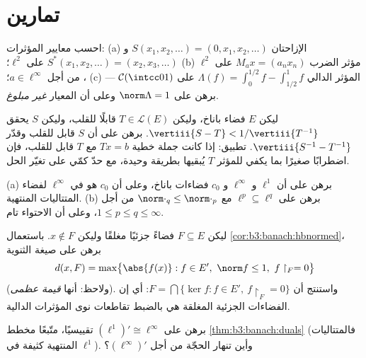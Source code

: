 \section{تمارين}

\begin{exercise}[$\star$]\label{exo:b3:banach:1}
احسب معايير المؤثرات:
(a) الإزاحتان $S(x_1, x_2, \dots) = (0, x_1, x_2, \dots)$ و $S^*(x_1, x_2, \dots) = (x_2, x_3, \dots)$ على $\ell^2$؛
(b) مؤثر الضرب $M_a x = (a_nx_n)$ على $\ell^2$، من أجل $a \in \ell^\infty$؛
(c) المؤثر الدالي $\Lambda(f) = \int_0^{1/2}f -
\int_{1/2}^1f$ على $\mathcal C(\intcc01)$ --- برهن على $\norm\Lambda = 1$ وعلى
أن المعيار \emph{غير مبلوغ}.
\end{exercise}

\begin{exercise}[$\star$]\label{exo:b3:banach:2}
ليكن $E$ فضاء باناخ، وليكن $T \in \mathcal L(E)$ قابلًا للقلب، وليكن $S$
يحقق $\vertiii{S - T} < 1/\vertiii{T^{-1}}$. برهن على أن $S$ قابل للقلب وقدّر $\vertiii{S^{-1} - T^{-1}}$. تطبيق:
إذا كانت جملة خطية $Tx = b$  مع $T$ قابل للقلب، فإن
اضطرابًا صغيرًا بما يكفي للمؤثر $T$ يُبقيها  بطريقة
وحيدة، مع حدّ كمّي على تغيّر الحل.
\end{exercise}

\begin{exercise}[$\star\star$]\label{exo:b3:banach:3}
(a) برهن على أن $\ell^1$ و $\ell^\infty$ و $c_0$ فضاءات باناخ،
وعلى أن $c_0$ هو  في $\ell^\infty$ لفضاء المتتاليات
المنتهية.
(b) برهن على $\ell^p \subseteq \ell^q$ مع $\norm\cdot_q \leq
\norm\cdot_p$ من أجل $1 \leq p \leq q \leq \infty$، وعلى أن
الاحتواء تام.
\end{exercise}

\begin{exercise}[$\star\star$]\label{exo:b3:banach:4}
ليكن $F \subseteq E$ فضاءً جزئيًا مغلقًا وليكن $x \notin F$.
باستعمال \cref{cor:b3:banach:hbnormed}، برهن على صيغة الثنوية
\[
d(x, F) = \max\bigl\{\abs{f(x)} : f \in E',\ \norm f \leq 1,\
f\restriction_F = 0\bigr\}
\]
(ولاحظ: أنها \emph{قيمة عظمى}). واستنتج أن $F = \bigcap\{\ker f : f
\in E',\ f\restriction_F = 0\}$: أي إن
الفضاءات الجزئية المغلقة هي بالضبط تقاطعات نوى المؤثرات
الدالية.
\end{exercise}

\begin{exercise}[$\star\star$]\label{exo:b3:banach:5}
برهن على $(\ell^1)' \cong \ell^\infty$ تقييسيًا، متّبعًا مخطط \cref{thm:b3:banach:duals} (فالمتتاليات
المنتهية كثيفة في $\ell^1$). وأين تنهار الحجّة من أجل
$(\ell^\infty)'$؟
\end{exercise}

